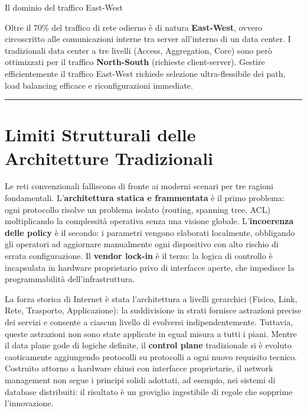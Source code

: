 \documentclass[
  italian,
  openany]{book}
\begin{document}
\begin{calloutnote}{Il dominio del traffico East-West}

Oltre il 70\% del traffico di rete odierno è di natura
\textbf{East-West}, ovvero circoscritto alle comunicazioni interne tra
server all'interno di un data center. I tradizionali data center a tre
livelli (Access, Aggregation, Core) sono però ottimizzati per il
traffico \textbf{North-South} (richieste client-server). Gestire
efficientemente il traffico East-West richiede selezione
ultra-flessibile dei path, load balancing efficace e riconfigurazioni
immediate.

\end{calloutnote}

\begin{center}\rule{0.5\linewidth}{0.5pt}\end{center}

\section{Limiti Strutturali delle Architetture
Tradizionali}\label{limiti-strutturali-delle-architetture-tradizionali}

Le reti convenzionali falliscono di fronte ai moderni scenari per tre
ragioni fondamentali. L'\textbf{architettura statica e frammentata} è il
primo problema: ogni protocollo risolve un problema isolato (routing,
spanning tree, ACL) moltiplicando la complessità operativa senza una
visione globale. L'\textbf{incoerenza delle policy} è il secondo: i
parametri vengono elaborati localmente, obbligando gli operatori ad
aggiornare manualmente ogni dispositivo con alto rischio di errata
configurazione. Il \textbf{vendor lock-in} è il terzo: la logica di
controllo è incapsulata in hardware proprietario privo di interfacce
aperte, che impedisce la programmabilità dell'infrastruttura.

La forza storica di Internet è stata l'architettura a livelli gerarchici
(Fisico, Link, Rete, Trasporto, Applicazione): la suddivisione in strati
fornisce astrazioni precise dei servizi e consente a ciascun livello di
evolversi indipendentemente. Tuttavia, queste astrazioni non sono state
applicate in egual misura a tutti i piani. Mentre il data plane gode di
logiche definite, il \textbf{control plane} tradizionale si è evoluto
caoticamente aggiungendo protocolli su protocolli a ogni nuovo requisito
tecnico. Costruito attorno a hardware chiusi con interfacce
proprietarie, il network management non segue i principi solidi
adottati, ad esempio, nei sistemi di database distribuiti: il risultato
è un groviglio ingestibile di regole che sopprime l'innovazione.
\end{document}
